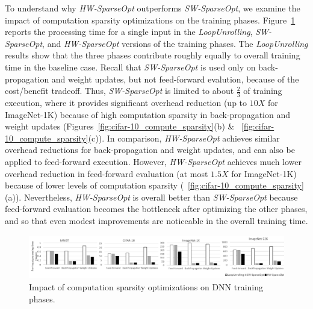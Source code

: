 To understand why {\it HW-SparseOpt} outperforms {\it SW-SparseOpt}, we examine the impact of computation sparsity optimizations on the training phases.  Figure~\ref{fig:training_breakdown} reports the processing time for a single input in the {\it LoopUnrolling}, {\it SW-SparseOpt}, and {\it HW-SparseOpt} versions of the training phases.  The {\it LoopUnrolling} results show that the three phases contribute roughly equally to overall training time in the baseline case.  Recall that {\it SW-SparseOpt} is used only on back-propagation and weight updates, but not feed-forward evalution, because of the cost/benefit tradeoff.   Thus, {\it SW-SparseOpt} is limited to about \(\frac{2}{3}\) of training execution, where it provides significant overhead reduction (up to $10X$ for ImageNet-1K) because of high computation sparsity in back-propagation and weight updates (Figures~\ref{fig:cifar-10_compute_sparsity}(b) \& ~\ref{fig:cifar-10_compute_sparsity}(c)).   In comparison, {\it HW-SparseOpt} achieves similar overhead reductions for back-propagation and weight updates, and can also be applied to feed-forward execution.  However,  {\it HW-SparseOpt}  achieves much lower overhead reduction in feed-forward evaluation  (at most $1.5X$ for ImageNet-1K) because of lower levels of computation sparsity (~\ref{fig:cifar-10_compute_sparsity}(a)).  Nevertheless, {\it HW-SparseOpt} is overall better than {\it SW-SparseOpt} because feed-forward evaluation becomes the bottleneck after optimizing the other phases, and so that even modest improvements are noticeable in the overall training time.

 \begin{figure}
 \centering
 \includegraphics[height=0.75in, width=1.95\columnwidth]{Figures/training_time_breakdown.png}
\caption{Impact of computation sparsity optimizations on DNN training phases.}
 \label{fig:training_breakdown}
 \end{figure}


